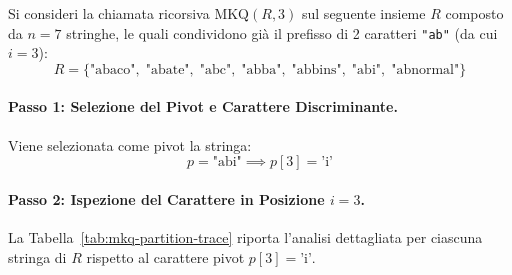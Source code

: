 Si consideri la chiamata ricorsiva $\text{MKQ}(R, 3)$ sul seguente insieme $R$ composto da $n = 7$ stringhe, le quali condividono gi\`a il prefisso di 2 caratteri \texttt{"ab"} (da cui $i = 3$):
\begin{equation}
  R = \{\text{"abaco"}, \; \text{"abate"}, \; \text{"abc"}, \; \text{"abba"}, \; \text{"abbins"}, \; \text{"abi"}, \; \text{"abnormal"}\}
\end{equation}

\paragraph{Passo 1: Selezione del Pivot e Carattere Discriminante.}
Viene selezionata come pivot la stringa:
\begin{equation}
  p = \text{"abi"} \implies p[3] = \text{'i'}
\end{equation}

\paragraph{Passo 2: Ispezione del Carattere in Posizione $i = 3$.}
La Tabella~\ref{tab:mkq-partition-trace} riporta l'analisi dettagliata per ciascuna stringa di $R$ rispetto al carattere pivot $p[3] = \text{'i'}$.

\begin{table}[H]
\centering
\small
{}
\caption{Tracciamento analitico del partizionamento a tre vie per la chiamata $\text{MKQ}(R, 3)$.}
\label{tab:mkq-partition-trace}
\end{table}

